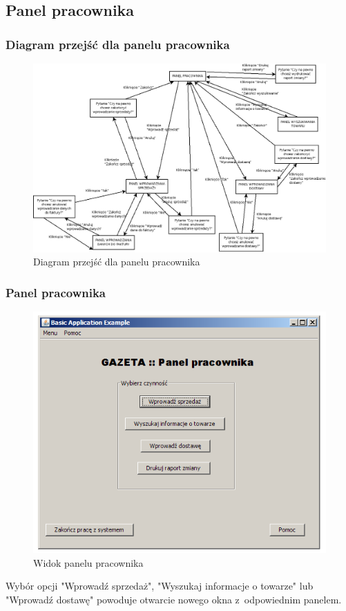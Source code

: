 \subsection{Panel pracownika}
\subsubsection{Diagram przejść dla panelu pracownika}
\begin{figure}[h]
\begin{center}
\includegraphics[width=15cm,angle=90,keepaspectratio]{gfx/przejscia_pracownik.png}
\caption{Diagram przejść dla panelu pracownika}
\end{center}
\end{figure}
\clearpage
\subsubsection{Panel pracownika}
\begin{figure}[h]
\includegraphics[width=1\textwidth]{gfx/pracownik.png}
\caption{Widok panelu pracownika}
\end{figure}
Wybór opcji "Wprowadź sprzedaż", "Wyszukaj informacje o towarze" lub "Wprowadź dostawę" powoduje otwarcie nowego okna z~odpowiednim panelem.

